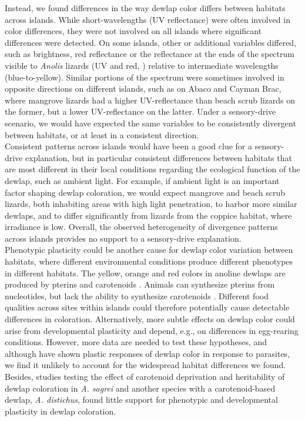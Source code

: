 Instead, we found differences in the way dewlap color differs between habitats across islands. While short-wavelengths (UV reflectance) were often involved in color differences, they were not involved on all islands where significant differences were detected. On some islands, other or additional variables differed, such as brightness, red reflectance or the reflectance at the ends of the spectrum visible to \textit{Anolis} lizards (UV and red, \citealt{Lazareva2012}) relative to intermediate wavelengths (blue-to-yellow). Similar portions of the spectrum were sometimes involved in opposite directions on different islands, such as on Abaco and Cayman Brac, where mangrove lizards had a higher UV-reflectance than beach scrub lizards on the former, but a lower UV-reflectance on the latter. Under a sensory-drive scenario, we would have expected the same variables to be consistently divergent between habitats, or at least in a consistent direction.\\

Consistent patterns across islands would have been a good clue for a sensory-drive explanation, but in particular consistent differences between habitats that are most different in their local conditions regarding the ecological function of the dewlap, such as ambient light. For example, if ambient light is an important factor shaping dewlap coloration, we would expect mangrove and beach scrub lizards, both inhabiting areas with high light penetration, to harbor more similar dewlaps, and to differ significantly from lizards from the coppice habitat, where irradiance is low. Overall, the observed heterogeneity of divergence patterns across islands provides no support to a sensory-drive explanation.\\

Phenotypic plasticity could be another cause for dewlap color variation between habitats, where different environmental conditions produce different phenotypes in different habitats. The yellow, orange and red colors in anoline dewlaps are produced by pterins and carotenoids \citep{Ortiz1962, Ortiz1962a, Ortiz1963, Ortiz1966, Macedonia2000, Steffen2007, Steffen2009}. Animals can synthesize pterins from nucleotides, but lack the ability to synthesize carotenoids \citep{Goodwin1984, Hill2002, Hill2006}. Different food qualities across sites within islands could therefore potentially cause detectable differences in coloration. Alternatively, more subtle effects on dewlap color could arise from developmental plasticity and depend, e.g., on differences in egg-rearing conditions. However, more data are needed to test these hypotheses, and although \citet{Cook2013} have shown plastic responses of dewlap color in response to parasites, we find it unlikely to account for the widespread habitat differences we found. Besides, studies testing the effect of carotenoid deprivation \citep{Steffen2010, Ng2013} and heritability \citep{Cox2017} of dewlap coloration in \textit{A. sagrei} and another species with a carotenoid-based dewlap, \textit{A. distichus}, found little support for phenotypic and developmental plasticity in dewlap coloration.\\

